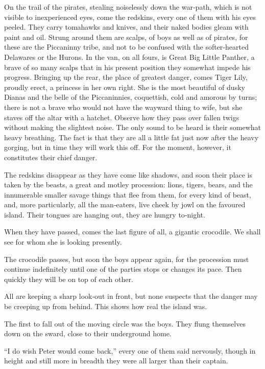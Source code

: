 On the trail of the pirates, stealing noiselessly down the war‐path, which is not visible to inexperienced eyes,
come the redskins, every one of them with his eyes peeled.
They carry tomahawks and knives, and their naked bodies gleam with paint and oil.
Strung around them are scalps, of boys as well as of pirates,
for these are the Piccaninny tribe, and not to be confused with the softer‐hearted Delawares or the Hurons.
In the van, on all fours, is Great Big Little Panther,
a brave of so many scalps that in his present position they somewhat impede his progress.
Bringing up the rear, the place of greatest danger,
comes Tiger Lily, proudly erect, a princess in her own right.
She is the most beautiful of dusky Dianas and the belle of the Piccaninnies,
coquettish, cold and amorous by turns;
there is not a brave who would not have the wayward thing to wife,
but she staves off the altar with a hatchet.
Observe how they pass over fallen twigs without making the slightest noise.
The only sound to be heard is their somewhat heavy breathing.
The fact is that they are all a little fat just now after the heavy gorging,
but in time they will work this off.
For the moment, however, it constitutes their chief danger.

The redskins disappear as they have come like shadows,
and soon their place is taken by the beasts, a great and motley procession:
lions, tigers, bears, and the innumerable smaller savage things that flee from them,
for every kind of beast, and, more particularly, all the man‐eaters,
live cheek by jowl on the favoured island.
Their tongues are hanging out, they are hungry to‐night.

When they have passed, comes the last figure of all, a gigantic crocodile.
We shall see for whom she is looking presently.

The crocodile passes, but soon the boys appear again,
for the procession must continue indefinitely until one of the parties stops or changes its pace.
Then quickly they will be on top of each other.

All are keeping a sharp look‐out in front,
but none suspects that the danger may be creeping up from behind.
This shows how real the island was.

The first to fall out of the moving circle was the boys.
They flung themselves down on the sward, close to their underground home.

“I do wish Peter would come back,” every one of them said nervously,
though in height and still more in breadth they were all larger than their captain.

